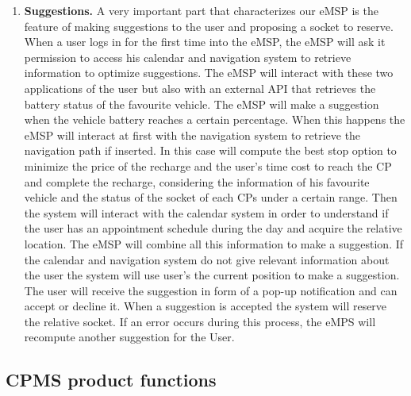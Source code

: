 \documentclass{Configuration_Files/PoliMi3i_thesis}
\begin{document}
\begin{enumerate}
    \item \textbf{Suggestions.} \newline
    A very important part that characterizes our eMSP is the feature of making suggestions to the user and proposing a socket to reserve. 
    When a user logs in for the first time into the eMSP, the eMSP will ask it permission to access his calendar and navigation system to retrieve information to optimize suggestions. The eMSP will interact with these two applications of the user but also with an external API that retrieves the battery status of the favourite vehicle. The eMSP will make a suggestion when the vehicle battery reaches a certain percentage. When this happens the eMSP will interact at first with the navigation system to retrieve the navigation path if inserted. In this case will compute the best stop option to minimize the price of the recharge and the user's time cost to reach the CP and complete the recharge, considering the information of his favourite vehicle and the status of the socket of each CPs under a certain range. 
    Then the system will interact with the calendar system in order to understand if the user has an appointment schedule during the day and acquire the relative location. 
    The eMSP will combine all this information to make a suggestion. 
    If the calendar and navigation system do not give relevant information about the user the system will use user’s the current position to make a suggestion.
    The user will receive the suggestion in form of a pop-up notification and can accept or decline it. When a suggestion is accepted the system will reserve the relative socket. If an error occurs during this process, the eMPS will recompute another suggestion for the User. 
\end{enumerate}

\subsection{CPMS product functions}
\end{document}
